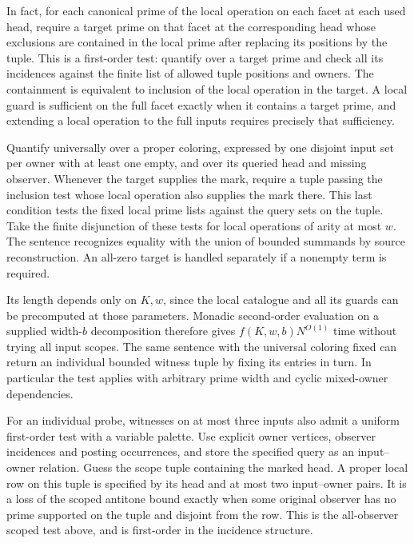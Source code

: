 In fact, for each canonical prime of the
local operation on each facet at each
used head, require a target prime on that
facet at the corresponding head whose
exclusions are contained in the local
prime after replacing its positions by
the tuple. This is a first-order test:
quantify over a target prime and check
all its incidences against the finite
list of allowed tuple positions and
owners. The containment is equivalent to
inclusion of the local operation in
the target. A local guard is sufficient
on the full facet exactly when it
contains a target prime, and extending
a local operation to the full inputs
requires precisely that sufficiency.

Quantify universally over a proper
coloring, expressed by one disjoint
input set per owner with at least one
empty, and over its queried head and
missing observer. Whenever the target
supplies the mark, require a tuple
passing the inclusion test whose local
operation also supplies the mark there.
This last condition tests the fixed
local prime lists against the query
sets on the tuple. Take the finite
disjunction of these tests for local
operations of arity at most $w$.
The sentence recognizes equality with
the union of bounded summands by
source reconstruction. An all-zero
target is handled separately if a
nonempty term is required.

Its length depends only on $K,w$,
since the local catalogue and all its
guards can be precomputed at those
parameters. Monadic second-order
evaluation on a supplied width-$b$
decomposition therefore gives
$f(K,w,b)N^{O(1)}$ time without trying
all input scopes. The same sentence
with the universal coloring fixed can
return an individual bounded witness
tuple by fixing its entries in turn.
In particular the test applies with
arbitrary prime width and cyclic
mixed-owner dependencies.

For an individual probe, witnesses on at most
three inputs also admit a uniform first-order
test with a variable palette. Use explicit owner
vertices, observer incidences and posting
occurrences, and store the specified query as
an input--owner relation. Guess the scope
tuple containing the marked head. A proper
local row on this tuple is specified by its
head and at most two input--owner pairs.
It is a loss of the scoped antitone bound
exactly when some original observer has no
prime supported on the tuple and disjoint
from the row. This is the all-observer
scoped test above, and is first-order in
the incidence structure.

